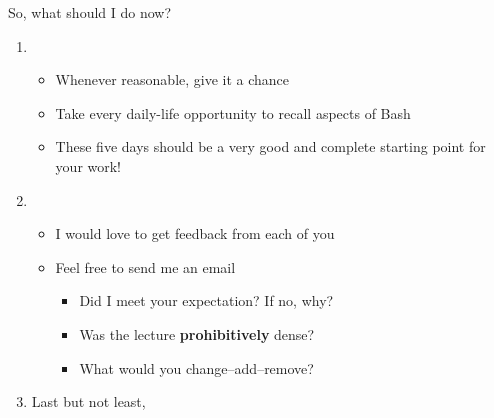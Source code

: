 \begin{frame}{So, what should I do now?}
    \vspace{-2mm}
    \begin{enumerate}
        \setlength{\itemsep}{1mm}
        \item<1-> 
                  \begin{itemize}
                    \item Whenever reasonable, give it a chance
                    \item Take every daily-life opportunity to recall aspects of Bash
                    \item These five days should be a very good and complete starting point for your work!
                  \end{itemize}
        \item<2-> 
                  \begin{itemize}
                      \item I would love to get feedback from each of you
                      \item Feel free to send me an email \,
                            \begin{itemize}
                                \item Did I meet your expectation? If no, why?
                                \item Was the lecture \textbf{prohibitively} dense? 
                                \item What would you change--add--remove?
                            \end{itemize}
                  \end{itemize}
        \item<3-> Last but not least,  $\;$
    \end{enumerate}
\end{frame}